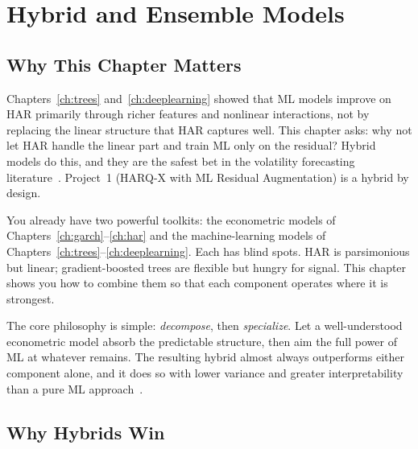 \chapter{Hybrid and Ensemble Models}\label{ch:hybrid}

\section{Why This Chapter Matters}

\begin{application}
Chapters~\ref{ch:trees} and~\ref{ch:deeplearning} showed that ML models
improve on HAR primarily through richer features and nonlinear interactions,
not by replacing the linear structure that HAR captures well.  This chapter
asks: why not let HAR handle the linear part and train ML only on the
residual?  Hybrid models do this, and they are the safest bet in the
volatility forecasting literature~\citep{RahimikiaPoon2020}.  Project~1
(HARQ-X with ML Residual Augmentation) is a hybrid by design.
\end{application}

You already have two powerful toolkits: the econometric models of
Chapters~\ref{ch:garch}--\ref{ch:har} and the machine-learning models of
Chapters~\ref{ch:trees}--\ref{ch:deeplearning}.  Each has blind spots.
HAR is parsimonious but linear; gradient-boosted trees are flexible but
hungry for signal.  This chapter shows you how to combine them so that
each component operates where it is strongest.

The core philosophy is simple: \emph{decompose}, then \emph{specialize}.
Let a well-understood econometric model absorb the predictable structure,
then aim the full power of ML at whatever remains.  The resulting hybrid
almost always outperforms either component alone, and it does so with
lower variance and greater interpretability than a pure ML
approach~\citep{RahimikiaPoon2020}.


\section{Why Hybrids Win}\label{sec:hybrid:why}

